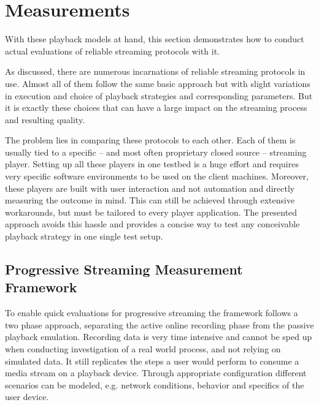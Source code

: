 \section{Measurements}
\label{c3:measurements}

With these playback models at hand, this section demonstrates how to conduct actual evaluations of reliable streaming protocols with it.

As discussed, there are numerous incarnations of reliable streaming protocols in use. Almost all of them follow the same basic approach but with slight variations in execution and choice of playback strategies and corresponding parameters. But it is exactly these choices that can have a large impact on the streaming process and resulting quality. 

The problem lies in comparing these protocols to each other. Each of them is usually tied to a specific -- and most often proprietary closed source -- streaming player. Setting up all these players in one testbed is a huge effort and requires very specific software environments to be used on the client machines. Moreover, these players are built with user interaction and not automation and directly measuring the outcome in mind. This can still be achieved through extensive workarounds, but must be tailored to every player application. The presented approach avoids this hassle and provides a concise way to test any conceivable playback strategy in one single test setup.



\subsection{Progressive Streaming Measurement Framework}

To enable quick evaluations for progressive streaming the framework follows a two phase approach, separating the active online recording phase from the passive playback emulation. Recording data is very time intensive and cannot be sped up when conducting investigation of a real world process, and not relying on simulated data. It still replicates the steps a user would perform to consume a media stream on a playback device. Through appropriate configuration different scenarios can be modeled, e.g. network conditions, behavior and specifics of the user device.
 
